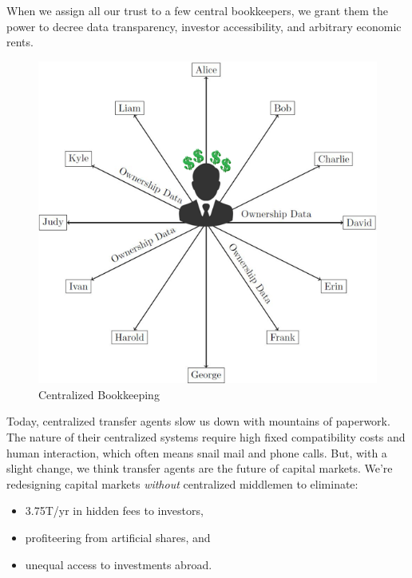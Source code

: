 \documentclass[11pt, english]{article}
\begin{document}
\begin{multicols}{2}

When we assign all our trust to a few central bookkeepers, we grant them the power to decree data transparency, investor accessibility, and arbitrary economic rents.

\begin{figure}[H]
    \raggedleft 
    \includegraphics[width=\linewidth]{centralized.png}
    \caption{Centralized Bookkeeping}
    \label{fig:centralized}
\end{figure}

Today, centralized transfer agents slow us down with mountains of paperwork. The nature of their centralized systems require high fixed compatibility costs and human interaction, which often means snail mail and phone calls. But, with a slight change, we think transfer agents are the future of capital markets. We're redesigning capital markets \hbox{\textit{without}} centralized middlemen to eliminate:
\begin{itemize}
    \item 3.75T/yr in hidden fees to investors,
    
    \item profiteering from artificial shares, and
    
    \item unequal access to investments abroad.
\end{itemize}




\end{multicols}
\end{document}
